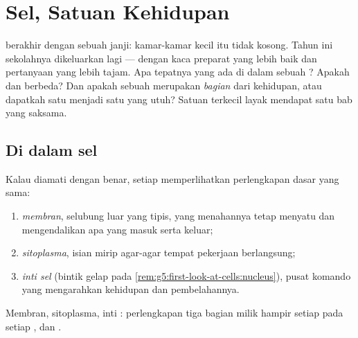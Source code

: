 \chapter{Sel, Satuan Kehidupan}\label{ch:g6:cell-unit-of-life}

 berakhir dengan sebuah janji:
kamar-kamar kecil itu tidak kosong. Tahun ini  sekolahnya
dikeluarkan lagi --- dengan kaca preparat yang lebih baik dan
pertanyaan yang lebih tajam. Apa tepatnya yang ada di dalam sebuah
? Apakah   dan   berbeda? Dan apakah sebuah 
merupakan \emph{bagian} dari kehidupan, atau dapatkah satu  menjadi
satu  yang utuh? Satuan terkecil  layak mendapat
satu bab yang saksama.

\section{Di dalam sel}

\begin{definition}\label{def:g6:cell-unit-of-life:parts}
Kalau diamati dengan benar, setiap  memperlihatkan perlengkapan
dasar yang sama:
\begin{enumerate}
  \item \emph{membran}, selubung luar  yang tipis,
        yang menahannya tetap menyatu dan mengendalikan apa yang masuk
        serta keluar;
  \item \emph{sitoplasma}, isian mirip agar-agar
        tempat pekerjaan  berlangsung;
  \item \emph{inti sel}
        (bintik gelap pada
        \cref{rem:g5:first-look-at-cells:nucleus}), pusat komando yang
        mengarahkan kehidupan  dan pembelahannya.
\end{enumerate}
Membran, sitoplasma, inti : perlengkapan tiga bagian milik hampir
setiap  pada setiap ,  dan .
\end{definition}

